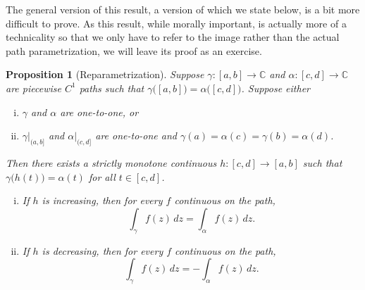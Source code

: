 \documentclass[12pt,openany]{book}
\newcommand{\C}{{\mathbb{C}}}
\theoremstyle{plain}
\newtheorem{prop}[thm]{Proposition}
\theoremstyle{remark}
\theoremstyle{definition}
\theoremstyle{exercise}
\theoremstyle{example}
\begin{document}
The general version of this result, a version of which we state below,
is a bit more difficult to prove.
As this result, while
morally important, is actually more of a technicality so that we only have
to refer to the image rather than the actual path parametrization, we will
leave its proof as an exercise.

\begin{prop}[Reparametrization]%
Suppose $\gamma \colon [a,b] \to \C$ and $\alpha \colon [c,d] \to \C$ are
piecewise $C^1$ paths such that
$\gamma\bigl([a,b]\bigr) = \alpha\bigl([c,d]\bigr)$.
Suppose either
\begin{enumerate}[(i)]
\item
$\gamma$ and $\alpha$ are one-to-one, or
\item
$\gamma|_{(a,b]}$ and
$\alpha|_{(c,d]}$ are one-to-one and 
$\gamma(a)=\alpha(c)=\gamma(b)=\alpha(d)$.
\end{enumerate}
Then there exists a strictly monotone continuous $h \colon [c,d] \to [a,b]$ such
that $\gamma\bigl(h(t)\bigr) = \alpha(t)$ for all $t \in [c,d]$.
\begin{enumerate}[(i)]
\item
If $h$ is increasing, then for every $f$ continuous on the path,
\begin{equation*}
\int_\gamma f(z) \, dz = \int_{\alpha} f(z) \, dz .
\end{equation*}
\item
If $h$ is decreasing, then for every $f$ continuous on the path,
\begin{equation*}
\int_\gamma f(z) \, dz = - \int_{\alpha} f(z) \, dz .
\end{equation*}
\end{enumerate}
\end{prop}
\end{document}
